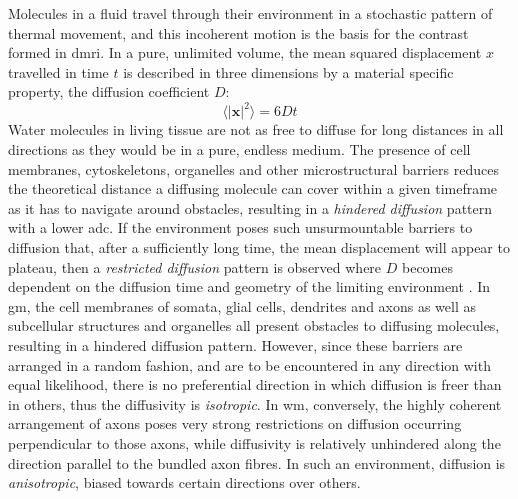 Molecules in a fluid travel through their environment in a stochastic pattern of thermal movement, and this incoherent motion is the basis for the contrast formed in \gls{dmri}.
In a pure, unlimited volume, the mean squared displacement $x$ travelled in time $t$ is described in three dimensions by a material specific property, the diffusion coefficient $D$:
\begin{equation}
  \langle |\mathbf{x}|^2 \rangle = 6Dt
\end{equation}
Water molecules in living tissue are not as free to diffuse for long distances in all directions as they would be in a pure, endless medium.
The presence of cell membranes, cytoskeletons, organelles and other microstructural barriers reduces the theoretical distance a diffusing molecule can cover within a given timeframe as it has to navigate around obstacles, resulting in a \textit{hindered diffusion} pattern with a lower \gls{adc}.
If the environment poses such unsurmountable barriers to diffusion that, after a sufficiently long time, the mean displacement will appear to plateau, then a \textit{restricted diffusion} pattern is observed where $D$ becomes dependent on the diffusion time and geometry of the limiting environment \autocite{LeBihan1986,LeBihan1995}.
In \gls{gm}, the cell membranes of somata, glial cells, dendrites and axons as well as subcellular structures and organelles all present obstacles to diffusing molecules, resulting in a hindered diffusion pattern.
However, since these barriers are arranged in a random fashion, and are to be encountered in any direction with equal likelihood, there is no preferential direction in which diffusion is freer than in others, thus the diffusivity is \textit{isotropic}.
In \gls{wm}, conversely, the highly coherent arrangement of axons poses very strong restrictions on diffusion occurring perpendicular to those axons, while diffusivity is relatively unhindered along the direction parallel to the bundled axon fibres.
In such an environment, diffusion is \textit{anisotropic}, biased towards certain directions over others.

